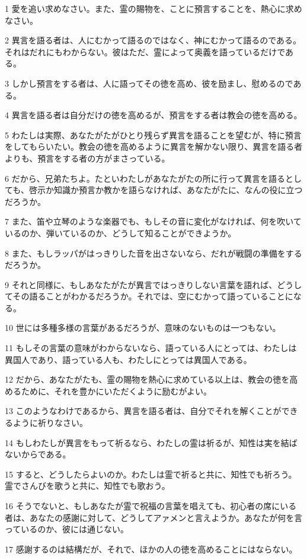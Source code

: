 \par 1 愛を追い求めなさい。また、霊の賜物を、ことに預言することを、熱心に求めなさい。
\par 2 異言を語る者は、人にむかって語るのではなく、神にむかって語るのである。それはだれにもわからない。彼はただ、霊によって奥義を語っているだけである。
\par 3 しかし預言をする者は、人に語ってその徳を高め、彼を励まし、慰めるのである。
\par 4 異言を語る者は自分だけの徳を高めるが、預言をする者は教会の徳を高める。
\par 5 わたしは実際、あなたがたがひとり残らず異言を語ることを望むが、特に預言をしてもらいたい。教会の徳を高めるように異言を解かない限り、異言を語る者よりも、預言をする者の方がまさっている。
\par 6 だから、兄弟たちよ。たといわたしがあなたがたの所に行って異言を語るとしても、啓示か知識か預言か教かを語らなければ、あなたがたに、なんの役に立つだろうか。
\par 7 また、笛や立琴のような楽器でも、もしその音に変化がなければ、何を吹いているのか、弾いているのか、どうして知ることができようか。
\par 8 また、もしラッパがはっきりした音を出さないなら、だれが戦闘の準備をするだろうか。
\par 9 それと同様に、もしあなたがたが異言ではっきりしない言葉を語れば、どうしてその語ることがわかるだろうか。それでは、空にむかって語っていることになる。
\par 10 世には多種多様の言葉があるだろうが、意味のないものは一つもない。
\par 11 もしその言葉の意味がわからないなら、語っている人にとっては、わたしは異国人であり、語っている人も、わたしにとっては異国人である。
\par 12 だから、あなたがたも、霊の賜物を熱心に求めている以上は、教会の徳を高めるために、それを豊かにいただくように励むがよい。
\par 13 このようなわけであるから、異言を語る者は、自分でそれを解くことができるように祈りなさい。
\par 14 もしわたしが異言をもって祈るなら、わたしの霊は祈るが、知性は実を結ばないからである。
\par 15 すると、どうしたらよいのか。わたしは霊で祈ると共に、知性でも祈ろう。霊でさんびを歌うと共に、知性でも歌おう。
\par 16 そうでないと、もしあなたが霊で祝福の言葉を唱えても、初心者の席にいる者は、あなたの感謝に対して、どうしてアァメンと言えようか。あなたが何を言っているのか、彼には通じない。
\par 17 感謝するのは結構だが、それで、ほかの人の徳を高めることにはならない。
